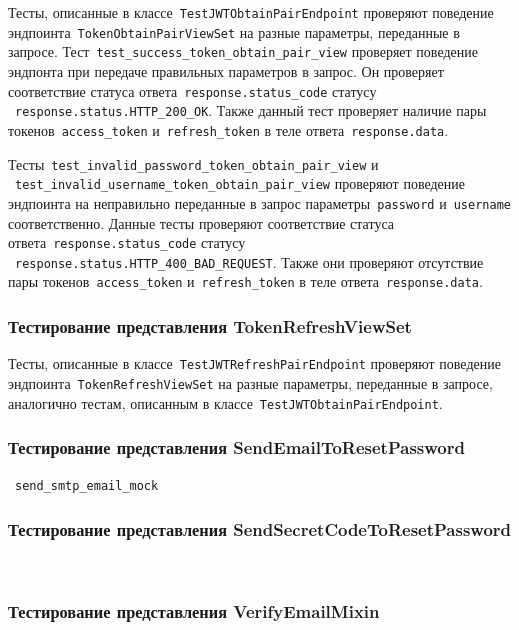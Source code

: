 Тесты, описанные в классе~\lstinline{TestJWTObtainPairEndpoint} проверяют поведение эндпоинта~\lstinline{TokenObtainPairViewSet} на
разные параметры, переданные в запросе.
Тест~\lstinline{test_success_token_obtain_pair_view} проверяет поведение эндпонта при передаче правильных параметров в запрос.
Он проверяет соответствие статуса ответа~\lstinline{response.status_code} статусу ~\lstinline{response.status.HTTP_200_OK}.
Также данный тест проверяет наличие пары токенов~\lstinline{access_token} и~\lstinline{refresh_token} в теле ответа~\lstinline{response.data}.

Тесты~\lstinline{test_invalid_password_token_obtain_pair_view} и
~\lstinline{test_invalid_username_token_obtain_pair_view} проверяют поведение эндпоинта на
неправильно переданные в запрос параметры~\lstinline{password} и~\lstinline{username} соответственно.
Данные тесты проверяют соответствие статуса ответа~\lstinline{response.status_code} статусу ~\lstinline{response.status.HTTP_400_BAD_REQUEST}.
Также они проверяют отсутствие пары токенов~\lstinline{access_token} и~\lstinline{refresh_token} в теле ответа~\lstinline{response.data}.

\subsubsection{Тестирование представления TokenRefreshViewSet}

Тесты, описанные в классе~\lstinline{TestJWTRefreshPairEndpoint} проверяют поведение эндпоинта~\lstinline{TokenRefreshViewSet} на
разные параметры, переданные в запросе, аналогично тестам, описанным в классе~\lstinline{TestJWTObtainPairEndpoint}.

\subsubsection{Тестирование представления SendEmailToResetPassword}
~\lstinline{send_smtp_email_mock}


\subsubsection{Тестирование представления SendSecretCodeToResetPassword}
~\lstinline{}


\subsubsection{Тестирование представления VerifyEmailMixin}
~\lstinline{}

